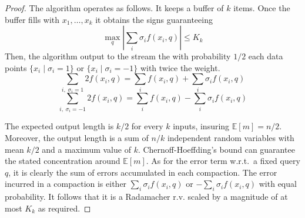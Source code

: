 \documentclass[anon,12pt]{colt2019} %
\newcommand{\el}[1]{\textcolor{blue}{EL: #1}}
\newcommand{\E}{\mathbb{E}}
\begin{document}
\begin{proof}
The algorithm operates as follows. It keeps a buffer of $k$ items. Once the buffer fills with $x_1,\ldots,x_k$ it obtains the signs guaranteeing
$$\max_q \left| \sum_i \sigma_i f(x_i, q)\right| \leq K_k$$
Then, the algorithm output to the stream the with probability $1/2$ each data points $\{x_i \; | \; \sigma_i = 1\}$ or $\{x_i \; | \; \sigma_i = -1\}$ with twice the weight.
$$\sum_{i ,\; \sigma_i=1} 2f(x_i, q) = \sum_{i} f(x_i, q) +  \sum_{i} \sigma_i f(x_i, q)$$
$$\sum_{i ,\; \sigma_i=-1} 2f(x_i, q) = \sum_{i} f(x_i, q) - \sum_{i} \sigma_i f(x_i, q)$$

The expected output length is $k/2$ for every $k$ inputs, insuring $\E[m]=n/2$. Moreover, the output length is a sum of $n/k$ independent random variables with mean $k/2$ and a maximum value of $k$. Chernoff-Hoeffding's bound can guarantee the stated concentration around $\E[m]$.
As for the error term w.r.t.\ a fixed query $q$, it is clearly the sum of errors accumulated in each compaction. The error incurred in a compaction is either 
$\sum_i \sigma_i f(x_i, q)$ or $-\sum_i \sigma_i f(x_i, q)$ with equal probability. It follows that it is a Radamacher r.v. scaled by a magnitude of at most $K_k$ as required.
\end{proof}
\end{document}

